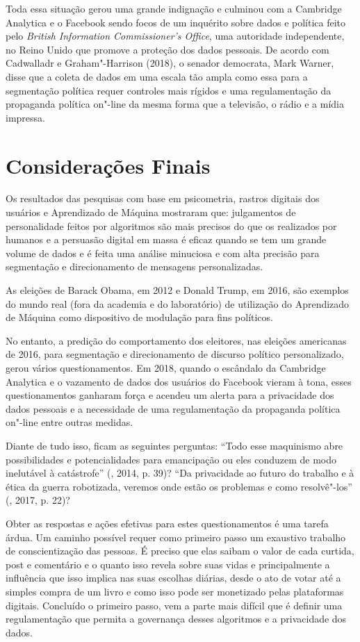 Toda essa situação gerou uma grande indignação e culminou com a
Cambridge Analytica e o Facebook sendo focos de um inquérito sobre dados
e política feito pelo \emph{British Information Commissioner's Office},
uma autoridade independente, no Reino Unido que promove a proteção dos
dados pessoais. De acordo com Cadwalladr e Graham"-Harrison
(2018), o senador democrata, Mark Warner, disse que a coleta de dados em
uma escala tão ampla como essa para a segmentação política requer
controles mais rígidos e uma regulamentação da propaganda política
on"-line da mesma forma que a televisão, o rádio e a mídia impressa.

\section{Considerações Finais}

Os resultados das pesquisas com base em psicometria, rastros digitais
dos usuários e Aprendizado de Máquina mostraram que: julgamentos de
personalidade feitos por algoritmos são mais precisos do que os
realizados por humanos e a persuasão digital em massa é eficaz quando se
tem um grande volume de dados e é feita uma análise minuciosa e com alta
precisão para segmentação e direcionamento de mensagens personalizadas.

As eleições de Barack Obama, em 2012 e Donald Trump, em 2016, são
exemplos do mundo real (fora da academia e do laboratório) de utilização
do Aprendizado de Máquina como dispositivo de modulação para fins
políticos.

No entanto, a predição do comportamento dos eleitores, nas eleições
americanas de 2016, para segmentação e direcionamento de discurso
político personalizado, gerou vários questionamentos. Em 2018, quando o
escândalo da Cambridge Analytica e o vazamento de dados dos usuários do
Facebook vieram à tona, esses questionamentos ganharam força e acendeu
um alerta para a privacidade dos dados pessoais e a necessidade de uma
regulamentação da propaganda política on"-line entre outras medidas.

Diante de tudo isso, ficam as seguintes perguntas: ``Todo esse
maquinismo abre possibilidades e potencialidades para emancipação ou
eles conduzem de modo inelutável à catástrofe'' (, 2014, p. 39)?
``Da privacidade ao futuro do trabalho e à ética da guerra robotizada,
veremos onde estão os problemas e como resolvê"-los'' (, 2017, p. 22)?

Obter as respostas e ações efetivas para estes questionamentos é uma
tarefa árdua. Um caminho possível requer como primeiro passo um
exaustivo trabalho de conscientização das pessoas. É preciso que elas
saibam o valor de cada curtida, post e comentário e o quanto isso revela
sobre suas vidas e principalmente a influência que isso implica nas suas
escolhas diárias, desde o ato de votar até a simples compra de um livro
e como isso pode ser monetizado pelas plataformas digitais. Concluído o
primeiro passo, vem a parte mais difícil que é definir uma
regulamentação que permita a governança desses algoritmos e a
privacidade dos dados.


